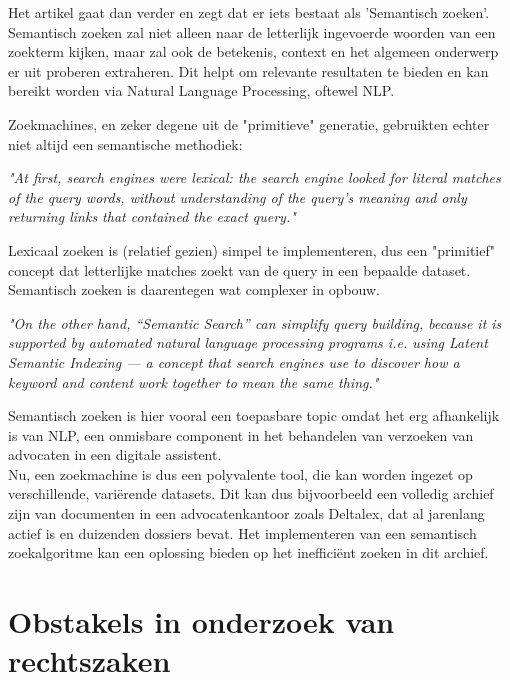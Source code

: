 Het artikel gaat dan verder en zegt dat er iets bestaat als 'Semantisch zoeken'. Semantisch zoeken zal niet alleen naar de letterlijk ingevoerde woorden van een zoekterm kijken,
maar zal ook de betekenis, context en het algemeen onderwerp er uit proberen extraheren. Dit helpt om relevante resultaten te bieden en kan bereikt worden via Natural Language Processing, oftewel \Gls{NLP}.
\newpage

Zoekmachines, en zeker degene uit de "primitieve" generatie, gebruikten echter niet altijd een semantische methodiek:

\begin{displayquote}
	\textit{"At first, search engines were lexical: the search engine looked for literal matches of the query words,
		without understanding of the query’s meaning and only returning links that contained the exact query."} \autocite{MediumSemanticSearch}
\end{displayquote}

Lexicaal zoeken is (relatief gezien) simpel te implementeren, dus een "primitief" concept dat letterlijke matches zoekt van de query in een bepaalde dataset.
Semantisch zoeken is daarentegen wat complexer in opbouw.

\begin{displayquote}
	\textit{"On the other hand, “Semantic Search” can simplify query building, because it is supported by automated natural language processing programs
		i.e. using Latent Semantic Indexing — a concept that search engines use to discover how a keyword and content work together to mean the same thing."} \autocite{MediumSemanticSearch}
\end{displayquote}

Semantisch zoeken is hier vooral een toepasbare topic omdat het erg afhankelijk is van NLP, een onmisbare component in het behandelen van verzoeken van advocaten in een digitale assistent.\\

Nu, een zoekmachine is dus een polyvalente tool, die kan worden ingezet op verschillende, variërende datasets.
Dit kan dus bijvoorbeeld een volledig archief zijn van documenten in een advocatenkantoor zoals Deltalex, dat al jarenlang actief is en duizenden dossiers bevat.
Het implementeren van een semantisch zoekalgoritme kan een oplossing bieden op het inefficiënt zoeken in dit archief.

\newpage
\section{Obstakels in onderzoek van rechtszaken}
